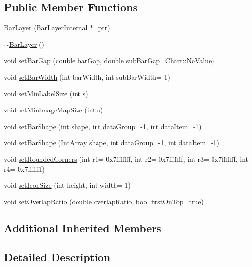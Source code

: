\subsection*{Public Member Functions}
\begin{DoxyCompactItemize}
\item 
\hyperlink{class_bar_layer_a836eab96793b97cf5a24a2ac35572e08}{Bar\+Layer} (Bar\+Layer\+Internal $\ast$\+\_\+ptr)
\item 
\hyperlink{class_bar_layer_a96f156f33d31eb54fe766cecc2ce3c9d}{$\sim$\+Bar\+Layer} ()
\item 
void \hyperlink{class_bar_layer_a2452f8f6856168aa6e9997a56fff1a05}{set\+Bar\+Gap} (double bar\+Gap, double sub\+Bar\+Gap=Chart\+::\+No\+Value)
\item 
void \hyperlink{class_bar_layer_a3399504b16dbb8730329bd232c04cd9b}{set\+Bar\+Width} (int bar\+Width, int sub\+Bar\+Width=-\/1)
\item 
void \hyperlink{class_bar_layer_a599f8b5e967c9f33662f1e9a89f7d2b4}{set\+Min\+Label\+Size} (int s)
\item 
void \hyperlink{class_bar_layer_a746e396fa24f9afd1f04f3534c05c17a}{set\+Min\+Image\+Map\+Size} (int s)
\item 
void \hyperlink{class_bar_layer_a95b024aa48934d0917b0342d16d4fca5}{set\+Bar\+Shape} (int shape, int data\+Group=-\/1, int data\+Item=-\/1)
\item 
void \hyperlink{class_bar_layer_a20e27cf55af05ef6191f52d506e20910}{set\+Bar\+Shape} (\hyperlink{class_int_array}{Int\+Array} shape, int data\+Group=-\/1, int data\+Item=-\/1)
\item 
void \hyperlink{class_bar_layer_ad2a0baf6268a1494d1025eb137eebd3f}{set\+Rounded\+Corners} (int r1=-\/0x7fffffff, int r2=-\/0x7fffffff, int r3=-\/0x7fffffff, int r4=-\/0x7fffffff)
\item 
void \hyperlink{class_bar_layer_ad61ea98d0fbe8a5e312af13dc5e0f837}{set\+Icon\+Size} (int height, int width=-\/1)
\item 
void \hyperlink{class_bar_layer_a422e4989ff347c49c30bc886ff87dbf4}{set\+Overlap\+Ratio} (double overlap\+Ratio, bool first\+On\+Top=true)
\end{DoxyCompactItemize}
\subsection*{Additional Inherited Members}


\subsection{Detailed Description}


